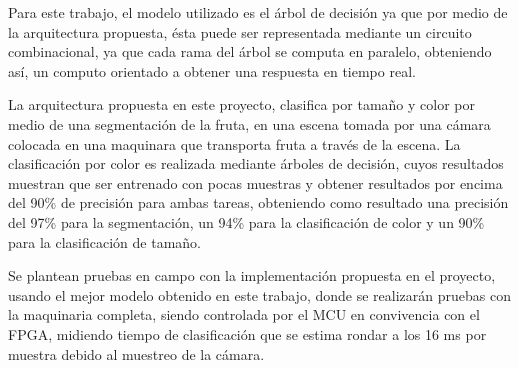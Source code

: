 \documentclass[twoside,spanish,ESP,MSc]{plantillaLabUPV}
\theoremstyle{definition}
\begin{document}
Para este trabajo, el modelo utilizado es el árbol de decisión ya que por medio de la arquitectura propuesta, ésta puede ser representada mediante un circuito combinacional, ya que cada rama del árbol se computa en paralelo, obteniendo así, un computo orientado a obtener una respuesta en tiempo real. 


La arquitectura propuesta en este proyecto, clasifica por tamaño y color por medio de una segmentación de la fruta, en una escena tomada por una cámara colocada en una maquinara que transporta fruta a través de la escena. La clasificación por color es realizada mediante árboles de decisión, cuyos resultados muestran que ser entrenado con pocas muestras y obtener resultados por encima del 90\% de precisión para ambas tareas, obteniendo como resultado una precisión del 97\% para la segmentación, un 94\% para la clasificación de color y un 90\% para la clasificación de tamaño.



%
%
%


Se plantean pruebas en campo con la implementación propuesta en el proyecto, usando el mejor modelo obtenido en este trabajo, donde se realizarán pruebas con la maquinaria completa, siendo controlada por el MCU en convivencia con el FPGA, midiendo tiempo de clasificación  que se estima rondar a los 16 ms por muestra debido al muestreo de la cámara.



\appendix
%


\end{document}

